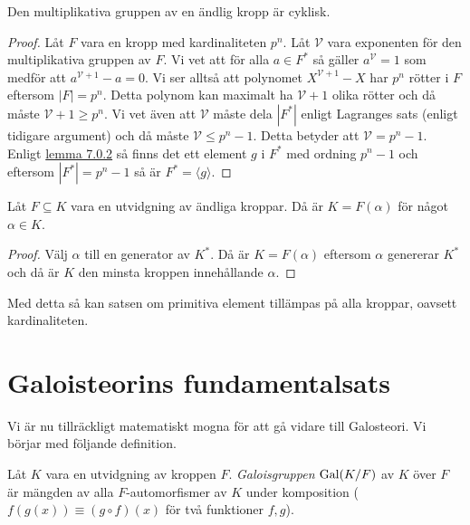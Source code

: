 \documentclass{article}
\newcommand{\gal}[0]{\textnormal{Gal}}
\theoremstyle{definition}
\begin{document}
\begin{mytheo}{}{}
  Den multiplikativa gruppen av en ändlig kropp är cyklisk. 
\end{mytheo}

\begin{proof}
  Låt $F$ vara en kropp med kardinaliteten $p^n$. Låt $\mathcal{V}$ vara exponenten för den multiplikativa gruppen av $F$. Vi vet att 
  för alla $a \in F^*$ så gäller $a^\mathcal{V} = 1$ som medför att $a^{\mathcal{V} + 1} -a = 0$. Vi ser alltså att polynomet $X^{\mathcal{V} + 1} -X$
  har $p^n$ rötter i $F$ eftersom $|F| = p^n$. Detta polynom kan maximalt ha $\mathcal{V} + 1$ olika rötter och då måste $\mathcal{V} + 1 \geq p^n.$
  Vi vet även att $\mathcal{V}$ måste dela $|F^*|$ enligt Lagranges sats (enligt tidigare argument) och då måste $\mathcal{V} \leq p^n - 1$.
  Detta betyder att $\mathcal{V} = p^n - 1.$ Enligt \hyperlink{lemma8.0.2}{lemma 7.0.2} så finns det ett element $g$ i $F^*$ med ordning $p^n -1$
  och eftersom $|F^*| = p^n -1$ så är $F^* = \langle g \rangle$.
\end{proof}

\begin{mykol}{}{}
  Låt $F \subseteq K$ vara en utvidgning av ändliga kroppar. Då är $K = F(\alpha)$ för något $\alpha \in K$.
\end{mykol}

\begin{proof}
  Välj $\alpha$ till en generator av $K^*$. Då är $K = F(\alpha)$ eftersom $\alpha$ genererar $K^*$ och då är $K$ den minsta kroppen innehållande 
  $\alpha$.
\end{proof}
Med detta så kan satsen om primitiva element tillämpas på alla kroppar, oavsett kardinaliteten.  

\section{Galoisteorins fundamentalsats}
Vi är nu tillräckligt matematiskt mogna för att gå vidare till Galosteori. Vi börjar med följande definition. 

\begin{mydef}{}{}
  Låt $K$ vara en utvidgning av kroppen $F$. \textit{Galoisgruppen} $\gal(K/F)$ av $K$ över $F$ är mängden av alla $F$-automorfismer av $K$
  under komposition ($f(g(x)) \equiv (g \circ f)(x)$ för två funktioner $f, g$).
\end{mydef}
\end{document}
